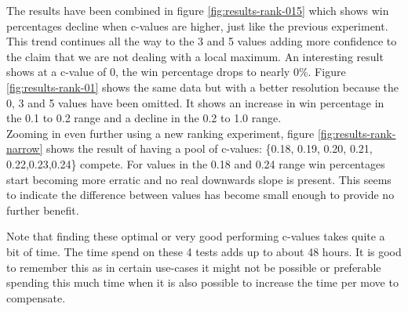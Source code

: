 \documentclass[
11pt, %
english, %
singlespacing, %
headsepline, %
]{MastersDoctoralThesis} %
\begin{document}
The results have been combined in figure \ref{fig:results-rank-015} which shows win percentages decline when c-values are higher, just like the previous experiment. This trend continues all the way to the 3 and 5 values adding more confidence to the claim that we are not dealing with a local maximum. An interesting result shows at a c-value of 0, the win percentage drops to nearly $0\%$.
Figure \ref{fig:results-rank-01} shows the same data but with a better resolution because the 0, 3 and 5 values have been omitted. It shows an increase in win percentage in the 0.1 to 0.2 range and a decline in the 0.2 to 1.0 range.\\

Zooming in even further using a new ranking experiment, figure \ref{fig:results-rank-narrow} shows the result of having a pool of c-values: \{0.18, 0.19, 0.20, 0.21, 0.22,0.23,0.24\} compete. For values in the 0.18 and 0.24 range win percentages start becoming more erratic and no real downwards slope is present. This seems to indicate the difference between values has become small enough to provide no further benefit.

Note that finding these optimal or very good performing c-values takes quite a bit of time. The time spend on these 4 tests adds up to about 48 hours. It is good to remember this as in certain use-cases it might not be possible or preferable spending this much time when it is also possible to increase the time per move to compensate.
\end{document}
